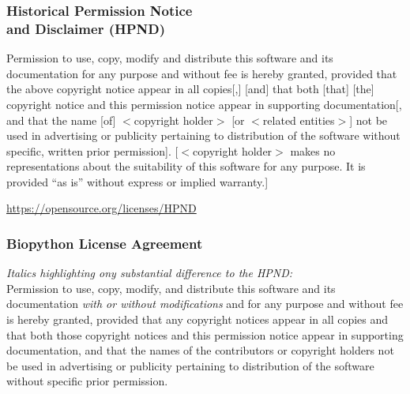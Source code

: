 \begin{frame}
\frametitle{Historical Permission Notice \\ and Disclaimer (HPND)}
Permission to use, copy, modify and distribute this software and its documentation for any purpose and without fee is hereby granted, provided that the above copyright notice appear in all copies[,] [and] that both [that] [the] copyright notice and this permission notice appear in supporting documentation[, and that the name [of] $<$copyright holder$>$ [or $<$related entities$>$] not be used in advertising or publicity pertaining to distribution of the software without specific, written prior permission]. [$<$copyright holder$>$ makes no representations about the suitability of this software for any purpose. It is provided ``as is'' without express or implied warranty.]


\url{https://opensource.org/licenses/HPND}
\end{frame}

\begin{frame}
\frametitle{Biopython License Agreement}
\textit{Italics highlighting ony substantial difference to the HPND:}
\vspace{6pt} \\

Permission to use, copy, modify, and distribute this software and its documentation \textit{with or without modifications} and for any purpose and without fee is hereby granted, provided that any copyright notices appear in all copies and that both those copyright notices and this permission notice appear in supporting documentation, and that the names of the contributors or copyright holders not be used in advertising or publicity pertaining to distribution of the software without specific prior permission.

\end{frame}

